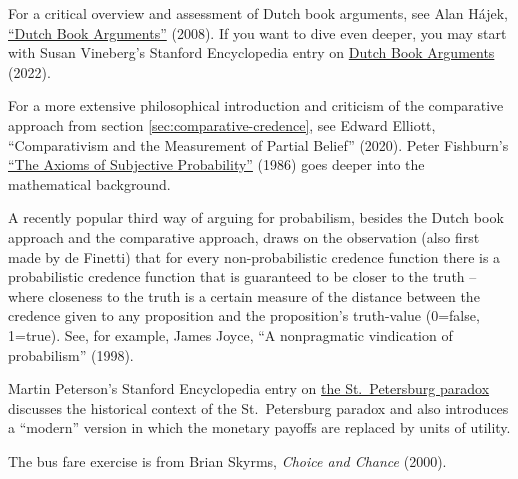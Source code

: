 \begin{sources}
  For a critical overview and assessment of Dutch book arguments, see Alan
  H\'ajek,
  \href{http://philrsss.anu.edu.au/people-defaults/alanh/papers/DBA.pdf}{``Dutch Book Arguments''}
  (2008). If you want to dive even deeper, you may start with Susan Vineberg's
  Stanford Encyclopedia entry on
  \href{https://plato.stanford.edu/entries/dutch-book/}{Dutch Book Arguments}
  (2022).

  For a more extensive philosophical introduction and criticism of the
  comparative approach from section \ref{sec:comparative-credence}, see Edward
  Elliott, ``Comparativism and the Measurement of Partial Belief'' (2020). Peter
  Fishburn's
  \href{https://projecteuclid.org/download/pdf_1/euclid.ss/1177013611}{``The Axioms of Subjective Probability''}
  (1986) goes deeper into the mathematical background.

  A recently popular third way of arguing for probabilism,
  besides the Dutch book approach and the comparative approach,
  draws on the observation (also first made by de Finetti) that
  for every non-probabilistic credence function
  there is a probabilistic credence function that is guaranteed to be closer to the truth --
  where closeness to the truth is a certain measure of the distance between the credence given to any proposition and the proposition's truth-value (0=false, 1=true).
  See, for example, James Joyce, ``A nonpragmatic vindication of probabilism'' (1998).

  Martin Peterson's Stanford Encyclopedia entry on
  \href{https://plato.stanford.edu/entries/paradox-stpetersburg/}{the St.\ Petersburg paradox}
  discusses the historical context of the St.\ Petersburg paradox
  and also introduces a ``modern'' version in which the monetary payoffs are replaced by units of utility.

  The bus fare exercise is from Brian Skyrms, \emph{Choice and Chance} (2000).
\end{sources}


 	
